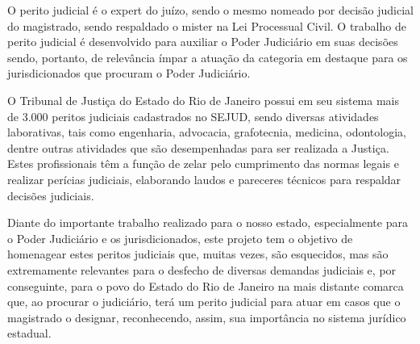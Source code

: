 \documentclass[10pt]{article}
\begin{document}
  O perito judicial é o expert do juízo, sendo o mesmo nomeado por decisão judicial do magistrado, sendo respaldado o mister na Lei Processual Civil. O trabalho de perito judicial é desenvolvido para auxiliar o Poder Judiciário em suas decisões sendo, portanto, de relevância ímpar a atuação da categoria em destaque para os jurisdicionados que procuram o Poder Judiciário.

O Tribunal de Justiça do Estado do Rio de Janeiro possui em seu sistema mais de 3.000 peritos judiciais cadastrados no SEJUD, sendo diversas atividades laborativas, tais como engenharia, advocacia, grafotecnia, medicina, odontologia, dentre outras atividades que são desempenhadas para ser realizada a Justiça. Estes profissionais têm a função de zelar pelo cumprimento das normas legais e realizar perícias judiciais, elaborando laudos e pareceres técnicos para respaldar decisões judiciais.

Diante do importante trabalho realizado para o nosso estado, especialmente para o Poder Judiciário e os jurisdicionados, este projeto tem o objetivo de homenagear estes peritos judiciais que, muitas vezes, são esquecidos, mas são extremamente relevantes para o desfecho de diversas demandas judiciais e, por conseguinte, para o povo do Estado do Rio de Janeiro na mais distante comarca que, ao procurar o judiciário, terá um perito judicial para atuar em casos que o magistrado o designar, reconhecendo, assim, sua importância no sistema jurídico estadual.



\iffalse
\begin{center}
  \textbf{REFERÊNCIAS}
\end{center}


\fi
\end{document}
